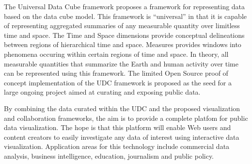 The Universal Data Cube framework proposes a framework for representing data based on the data cube model. This framework is ``universal'' in that it is capable of representing aggregated summaries of any measurable quantity over limitless time and space. The Time and Space dimensions provide conceptual delineations between regions of hierarchical time and space. Measures provides windows into phenomena occuring within certain regions of time and space. In theory, all measurable quantities that summarize the Earth and human activity over time can be represented using this framework. The limited Open Source proof of concept implementation of the UDC framework is proposed as the seed for a large ongoing project aimed at curating and exposing public data.

By combining the data curated within the UDC and the proposed visualization and collaboration frameworks, the aim is to provide a complete platfom for public data visualization. The hope is that this platform will enable Web users and content creators to easily investigate any data of interest using interactive data visualization. Application areas for this technology include commercial data analysis, business intelligence, education, journalism and public policy.
